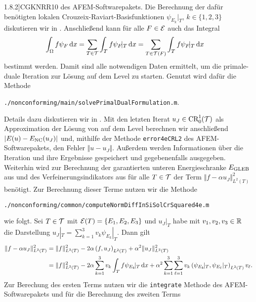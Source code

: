 1.8.2]{CGKNRR10} des AFEM-Softwarepakets.
Die Berechnung der dafür benötigten lokalen Crouzeix-Raviart-Basisfunktionen
$\psi_{E_k}\!|_T$, $k\in\{1,2,3\}$ diskutieren wir in
.
Anschließend kann für alle $F\in\mathcal{E}$ auch das Integral 
\begin{align*}
  \int_\Omega f\psi_F\,\mathrm{d}x
  &=
  \sum_{T\in\mathcal{T}}\int_T f\psi_F\!|_T\,\mathrm{d}x
  =
  \sum_{T\in\mathcal{T}(F)}\int_T f\psi_F\!|_T\,\mathrm{d}x
\end{align*}
bestimmt werden.
Damit sind alle notwendigen Daten ermittelt, um die primale-duale Iteration 
zur Lösung auf dem Level zu starten. Genutzt wird dafür die Methode
\begin{center}
  \texttt{./nonconforming/main/solvePrimalDualFormulation.m}.
\end{center}
Details dazu diskutieren wir in .
Mit den letzten Iterat $u_J\in\textup{CR}^1_0(\mathcal{T})$ als Approximation der Lösung von
 auf dem Level berechnen wir anschließend
$|E(u)-E_\textup{NC}(u_J)|$ und, mithilfe der Methode \texttt{error4eCRL2}
\cite[Abschnitt 1.8.3]{CGKNRR10} des AFEM-Soft\-ware\-pakets, den
Fehler $\Vert u - u_J\Vert$.
Außerdem werden Informationen über die Iteration und ihre Ergebnisse
gespeichert und gegebenenfalls ausgegeben. 
Weiterhin wird zur Berechnung der garantierten unteren Energieschranke $E_\textup{GLEB}$
aus  und des Verfeinerungsindikators aus
 für alle $T\in\mathcal{T}$ der Term $\Vert f-\alpha
u_J\Vert_{L^2(T)}^2$ benötigt.
Zur Berechnung dieser Terme nutzen wir die Methode
\begin{center}
  \texttt{./nonconforming/common/computeNormDiffInSiSolCrSquared4e.m}
\end{center}
wie folgt. 
Sei $T\in\mathcal{T}$ mit $\mathcal{E}(T)=\{E_1,E_2,E_3\}$ und $u_J|_T$ habe mit
$v_1,v_2,v_3\in\mathbb{R}$ die Darstellung $u_J|_T=\sum_{k=1}^3 v_k\psi_{E_k}\!|_T$.
Dann gilt
\begin{align*}
  \Vert f-\alpha u_J\Vert_{L^2(T)}^2 
  &=
  \Vert f\Vert_{L^2(T)}^2 - 2\alpha\left(f,u_J\right)_{L^2(T)} + \alpha^2 \Vert
  u_J\Vert_{L^2(T)}^2\\
  &=
  \Vert f\Vert_{L^2(T)}^2 
  - 2\alpha\sum_{k=1}^3 v_k\int_T f\psi_{E_k}\!|_T\,\mathrm{d}x
  + \alpha^2 \sum_{k=1}^3 \sum_{\ell=1}^3 
  v_k \left(\psi_{E_k}\!|_T,\psi_{E_\ell}|_T\right)_{L^2(T)}v_\ell.
\end{align*} Zur Berechung des ersten Terms nutzen wir die \texttt{integrate}
Methode des AFEM-Soft\-ware\-pakets und für die Berechnung des zweiten Terms
